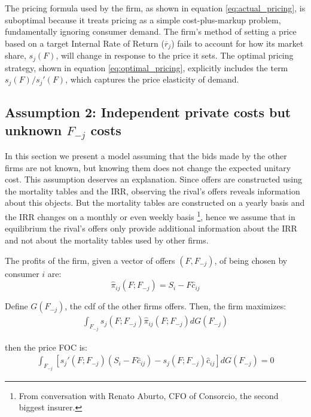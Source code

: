 \documentclass[12pt]{article}
\theoremstyle{plain}
\theoremstyle{plain}
\begin{document}
 The pricing formula used by the firm, as shown in equation \ref{eq:actual_pricing}, is suboptimal because it treats pricing as a simple cost-plus-markup problem, fundamentally ignoring consumer demand. The firm's method of setting a price based on a target Internal Rate of Return (\(\overline{r}_j\)) fails to account for how its market share, \(s_j(F)\), will change in response to the price it sets. The optimal pricing strategy, shown in equation \ref{eq:optimal_pricing}, explicitly includes the term \(s_j(F)/s_j'(F)\), which captures the price elasticity of demand. 


 
\newpage

\subsection{Assumption 2: Independent private costs but unknown $F_{-j}$ costs}\label{sec:interdependent}


In this section we present a model assuming that the bids made by the other firms are not known, but knowing them does not change the expected unitary cost. 
This assumption deserves an explanation. Since offers are constructed using the mortality tables and the IRR, observing the rival's offers reveals information about this objects. But the mortality tables are constructed on a yearly basis and the IRR changes on a monthly or even weekly basis \footnote{From conversation with Renato Aburto, CFO of Consorcio, the second biggest insurer.}, hence we assume that in equilibrium the rival's offers only provide additional information about the IRR and not about the mortality tables used by other firms. 

The profits of the firm, given a vector of offers $(F, F_{-j})$, of being chosen by consumer $i$ are: 
\begin{equation}
\hat{\pi}_{ij}(F;F_{-j})=S_{i}-F\hat{c}_{ij}
\end{equation}

Define $G(F_{-j})$, the cdf of the other firms offers. Then, the firm maximizes: 
\begin{align*}
    \int_{F_{-j}} s_j(F; F_{-j})\hat{\pi}_{ij}(F;F_{-j}) dG(F_{-j})
\end{align*}


then the price FOC is: 
\begin{align*}
    \int_{F_{-j}} \left[s_j'(F; F_{-j}) \left(S_{i}-F\hat{c}_{ij}\right)- s_j(F; F_{-j}) \hat{c}_{ij}  \right]dG(F_{-j})=0
\end{align*} 
\end{document}
